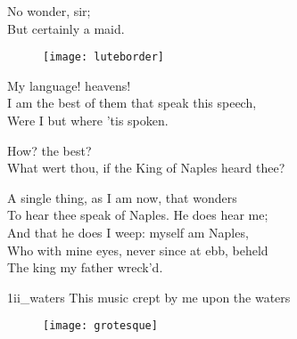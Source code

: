 \begin{verse_speech}[Miranda] 
No wonder, sir;\\
But certainly a maid.
\end{verse_speech}

\begin{figure}[tb]
	\centering
	\texttt{[image: luteborder]}
\end{figure}


\begin{verse_speech}[Ferdinand] 
My language! heavens!\\
I am the best of them that speak this speech,\\
Were I but where 'tis spoken.
\end{verse_speech}

\begin{verse_speech}[Prospero] 
How? the best?\\
What wert thou, if the King of Naples heard thee?
\end{verse_speech}

\begin{verse_speech}[Ferdinand] 
A single thing, as I am now, that wonders\\
To hear thee speak of Naples. He does hear me;\\
And that he does I weep: myself am Naples,\\
Who with mine eyes, never since at ebb, beheld\\
The king my father wreck'd.
\end{verse_speech}

\begin{pictures} %
	\begin{letter}
		\begin{colorbigpic}
			[1.1]
			{1ii_waters}
			{This music crept by me upon the waters}
		\end{colorbigpic}
	\end{letter}
\end{pictures}


\begin{a4}
	\begin{figure}[tb]
		\centering
		\texttt{[image: grotesque]}
	\end{figure}
\end{a4}



